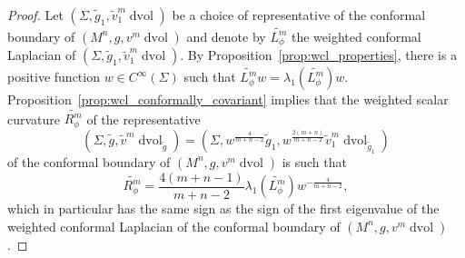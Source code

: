 \documentclass{amsart}
\theoremstyle{definition}
\theoremstyle{remark}
\numberwithin{equation}{section}
\begin{document}
\begin{proof}

Let $(\Sigma,\tilde g_1, \tilde v_1^m\operatorname{dvol})$ be a choice of representative of the conformal boundary of $(M^n,g,v^m\operatorname{dvol})$ and denote by $\widetilde{L_\phi^m}$ the weighted conformal Laplacian of $(\Sigma,\tilde g_1,\tilde v_1^m\operatorname{dvol})$.  By Proposition~\ref{prop:wcl_properties}, there is a positive function $w\in C^\infty(\Sigma)$ such that $\widetilde{L_\phi^m}w=\lambda_1(\widetilde{L_\phi^m})w$.  Proposition~\ref{prop:wcl_conformally_covariant} implies that the weighted scalar curvature $\widetilde{R_\phi^m}$ of the representative
\begin{equation}
\label{eqn:w_scms}
\left( \Sigma,\tilde g,\tilde v^m\operatorname{dvol}_{\tilde g} \right) = \left( \Sigma,w^{\frac{4}{m+n-2}}\tilde g_1, w^{\frac{2(m+n)}{m+n-2}}\tilde v_1^m\operatorname{dvol}_{\tilde g_1} \right)
\end{equation}
of the conformal boundary of $(M^n,g,v^m\operatorname{dvol})$ is such that
\[ \widetilde{R_\phi^m}=\frac{4(m+n-1)}{m+n-2}\lambda_1(\widetilde{L_\phi^m})w^{-\frac{4}{m+n-2}}, \]
which in particular has the same sign as the sign of the first eigenvalue of the weighted conformal Laplacian of the conformal boundary of $(M^n,g,v^m\operatorname{dvol})$.


\end{proof}
\end{document}
